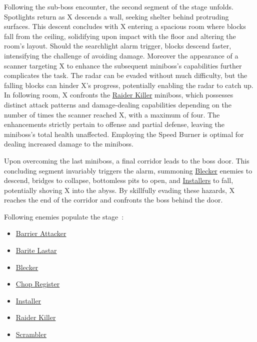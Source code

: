 Following the sub-boss encounter, the second segment of the stage unfolds. Spotlights return as X descends a wall, seeking shelter behind protruding surfaces. This descent concludes with X entering a spacious room where blocks fall from the ceiling, solidifying upon impact with the floor and altering the room's layout. Should the searchlight alarm trigger, blocks descend faster, intensifying the challenge of avoiding damage. Moreover the appearance of a scanner targeting X to enhance the subsequent miniboss's capabilities further complicates the task. The radar can be evaded without much difficulty, but the falling blocks can hinder X's progress, potentially enabling the radar to catch up. In following room, X confronts the \hyperlink{miniboss:Raider_Killer}{Raider Killer} miniboss, which possesses distinct attack patterns and damage-dealing capabilities depending on the number of times the scanner reached X, with a maximum of four. The enhancements strictly pertain to offense and partial defense, leaving the miniboss's total health unaffected. Employing the Speed Burner is optimal for dealing increased damage to the miniboss.

Upon overcoming the last miniboss, a final corridor leads to the boss door. This concluding segment invariably triggers the alarm, summoning \hyperlink{enem:Blecker}{Blecker} enemies to descend, bridges to collapse, bottomless pits to open, and \hyperlink{enem:Installer}{Installers} to fall, potentially shoving X into the abyss. By skillfully evading these hazards, X reaches the end of the corridor and confronts the boss behind the door.

Following enemies populate the stage~\cite{wiki:Central_computer}:
\begin{itemize}
	\item \hyperlink{enem:Barrier_Attacker}{Barrier Attacker}
	\item \hyperlink{enem:Barite_Lastar}{Barite Lastar}
	\item \hyperlink{enem:Blecker}{Blecker}
	\item \hyperlink{miniboss:Chop_Register}{Chop Register}
	\item \hyperlink{enem:Installer}{Installer}
	\item \hyperlink{miniboss:Raider_Killer}{Raider Killer}
	\item \hyperlink{enem:Scrambler}{Scrambler}
\end{itemize}

